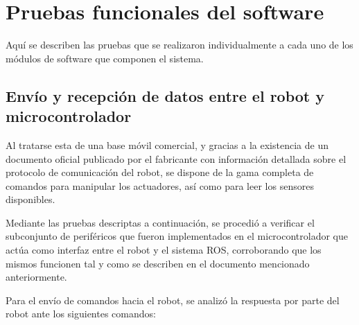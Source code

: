 


\section{Pruebas funcionales del software}
\label{sec:pruebasSW}

Aquí se describen las pruebas que se realizaron individualmente a cada uno de los módulos de software que componen el sistema.

\subsection{Envío y recepción de datos entre el robot y microcontrolador}

Al tratarse esta de una base móvil comercial, y gracias a la existencia de un documento oficial publicado por el fabricante con información detallada sobre el protocolo de comunicación del robot, se dispone de la gama completa de comandos para manipular los actuadores, así como para leer los sensores disponibles.

Mediante las pruebas descriptas a continuación, se procedió a verificar el subconjunto de periféricos que fueron implementados en el microcontrolador que actúa como interfaz entre el robot y el sistema ROS, corroborando que los mismos funcionen tal y como se describen en el documento mencionado anteriormente.

Para el envío de comandos hacia el robot, se analizó la respuesta por parte del robot ante los siguientes comandos:

